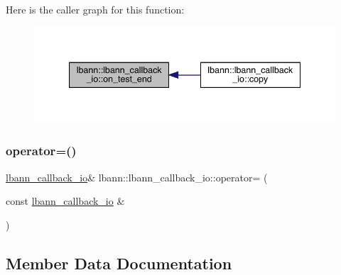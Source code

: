 Here is the caller graph for this function\+:\nopagebreak
\begin{figure}[H]
\begin{center}
\leavevmode
\includegraphics[width=340pt]{classlbann_1_1lbann__callback__io_a8abca84e4b0dc21b28e5d5e409446fdc_icgraph}
\end{center}
\end{figure}
\mbox{\label{classlbann_1_1lbann__callback__io_aaf50b99e51a2ac42a987c7354e52c1e7}} 
\subsubsection{\texorpdfstring{operator=()}{operator=()}}
{\footnotesize\ttfamily \hyperlink{classlbann_1_1lbann__callback__io}{lbann\+\_\+callback\+\_\+io}\& lbann\+::lbann\+\_\+callback\+\_\+io\+::operator= (\begin{DoxyParamCaption}\item[{const \hyperlink{classlbann_1_1lbann__callback__io}{lbann\+\_\+callback\+\_\+io} \&}]{ }\end{DoxyParamCaption})\hspace{0.3cm}{\ttfamily [default]}}



\subsection{Member Data Documentation}
\mbox{\label{classlbann_1_1lbann__callback__io_ab2105f5ed94c9c053b2873ea3a87bc21}} 
